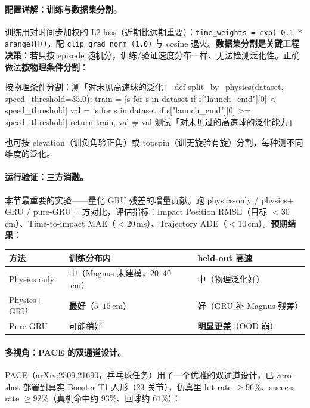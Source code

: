 \paragraph{配置详解：训练与数据集分割。}训练用对时间步加权的 L2 loss（近期比远期重要）：\verb|time_weights = exp(-0.1 * arange(H))|，配 \verb|clip_grad_norm_(1.0)| 与 cosine 退火。\textbf{数据集分割是关键工程决策}：若只按 episode 随机分，训练/验证速度分布一样、无法检测泛化性。正确做法\textbf{按物理条件分割}：

\begin{codebox}[Python]{按物理条件分割：测「对未见高速球的泛化」}
def split_by_physics(dataset, speed_threshold=35.0):
    train = [s for s in dataset if s["launch_cmd"][0] <  speed_threshold]
    val   = [s for s in dataset if s["launch_cmd"][0] >= speed_threshold]
    return train, val      # val 测试「对未见过的高速球的泛化能力」
\end{codebox}

也可按 elevation（训负角验正角）或 topspin（训无旋验有旋）分割，每种测不同维度的泛化。

\paragraph{运行验证：三方消融。}本节最重要的实验——量化 GRU 残差的增量贡献。跑 physics-only / physics$+$GRU / pure-GRU 三方对比，评估指标：Impact Position RMSE（目标 $<30$\,cm）、Time-to-impact MAE（$<20$\,ms）、Trajectory ADE（$<10$\,cm）。\textbf{预期结果}：

\begin{center}
\small
\begin{tabular}{@{}lll@{}}
\toprule
方法 & 训练分布内 & held-out 高速 \\
\midrule
Physics-only & 中（Magnus 未建模，$20$--$40$\,cm） & 中（物理泛化好） \\
Physics$+$GRU & \textbf{最好}（$5$--$15$\,cm） & 好（GRU 补 Magnus 残差） \\
Pure GRU & 可能稍好 & \textbf{明显更差}（OOD 崩） \\
\bottomrule
\end{tabular}
\end{center}


\paragraph{多视角：PACE 的双通道设计。}PACE（arXiv:2509.21690，乒乓球任务）用了一个优雅的双通道设计，已 zero-shot 部署到真实 Booster T1 人形（23 关节），仿真里 hit rate $\ge 96\%$、success rate $\ge 92\%$（真机命中约 $93\%$、回球约 $61\%$）\cite{tennis_pace2025}：


